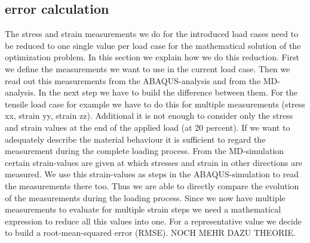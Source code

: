     

    \subsection{error calculation}
    The stress and strain measurements we do for the introduced load cases need to be reduced to one single value per load case for the mathematical solution of the optimization problem. 
    In this section we explain how we do this reduction. 
    First we define the measurements we want to use in the current load case. Then we read out this measurements from the ABAQUS-analysis and from the MD-analysis. In the next step we have to build the difference between them. For the tensile load case for example we have to do this for multiple measurements (stress xx, strain yy, strain zz). Additional it is not enough to consider only the stress and strain values at the end of the applied load (at 20 percent). If we want to adequately describe the material behaviour it is sufficient to regard the measurement during the complete loading process. From the MD-simulation certain strain-values are given at which stresses and strain in other directions are measured. We use this strain-values as steps in the ABAQUS-simulation to read the measurements there too. Thus we are able to directly compare the evolution of the measurements during the loading process. Since we now have multiple measurements to evaluate for multiple strain steps we need a mathematical expression to reduce all this values into one. For a representative value we decide to build a root-mean-squared error (RMSE). NOCH MEHR DAZU THEORIE. 
